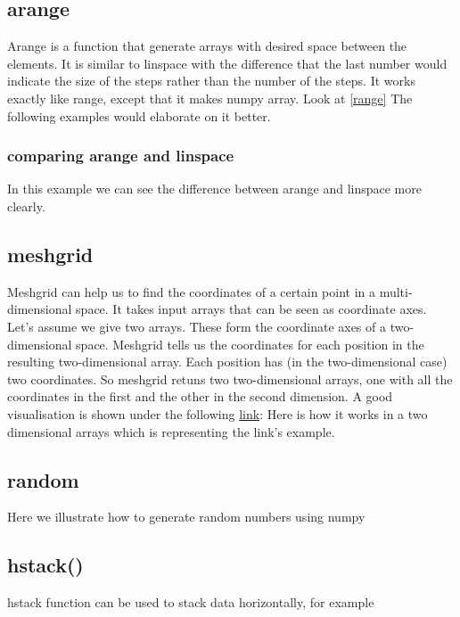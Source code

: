 \documentclass[10pt,a4paper]{article}
\begin{document}
\subsection{arange} \label{arange}
Arange is a function that generate arrays with desired space between the elements. It is similar to linspace with the difference that the last number would indicate the size of the steps rather than the number of the steps. It works exactly like range, except that it makes numpy array. Look at \ref{range} The following examples would elaborate on it better.



\subsubsection{comparing arange and linspace}
In this example we can see the difference between arange and linspace more clearly.



\subsection{meshgrid}
Meshgrid can help us to find the coordinates of a certain point in a multi-dimensional space. It takes input arrays that can be seen as coordinate axes. Let's assume we give two arrays. These form the coordinate axes of a two-dimensional space. Meshgrid tells us the coordinates for each position in the resulting two-dimensional array. Each position has (in the two-dimensional case) two coordinates. So meshgrid retuns two two-dimensional arrays, one with all the coordinates in the first and the other in the second dimension. A good visualisation is shown under the following 
\href{https://browse.startpage.com/do/show_picture.pl?l=english&rais=1&oiu=https%3A%2F%2Fi.stack.imgur.com%2F8Mbig.png&sp=68ba4eb553807530320e70250d5a4696&t=default}{link}:
Here is how it works in a two dimensional arrays which is representing the link's example.



\subsection{random}
Here we illustrate how to generate random numbers using numpy



\subsection{hstack()}
hstack function can be used to stack data horizontally, for example

\end{document}
